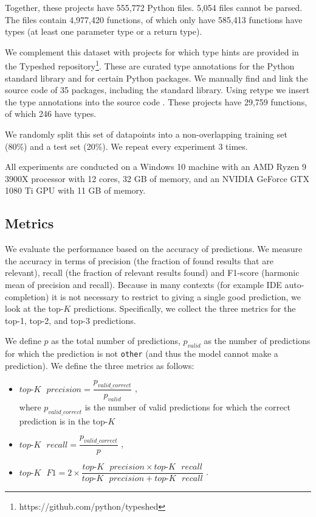 Together, these projects have 555,772 Python files. 5,054 files cannot be parsed.
The files contain 4,977,420 functions, of which only have 585,413 functions have types (at least one parameter type or a return type).

We complement this dataset with projects for which type hints are provided in the Typeshed repository\footnote{https://github.com/python/typeshed}. These are curated type annotations for the Python standard library and for certain Python packages. We manually find and link the source code of 35 packages, including the standard library. Using retype we insert the type annotations into the source code \cite{2017Retype}. These projects have 29,759 functions, of which 246 have types.

We randomly split this set of datapoints into a non-overlapping training set (80\%) and a test set (20\%). We repeat every experiment 3 times.

All experiments are conducted on a Windows 10 machine with an AMD Ryzen 9 3900X processor with 12 cores, 32 GB of memory, and an NVIDIA GeForce GTX 1080 Ti GPU with 11 GB of memory.

\subsection{Metrics} \label{evaluation:metrics}
We evaluate the performance based on the accuracy of predictions.
We measure the accuracy in terms of precision (the fraction of found results that are relevant), recall (the fraction of relevant results found) and F1-score (harmonic mean of precision and recall).
Because in many contexts (for example IDE auto-completion) it is not necessary to restrict to giving a single good prediction, we look at the top-$K$ predictions. 
Specifically, we collect the three metrics for the top-1, top-2, and top-3 predictions.

We define $p$ as the total number of predictions, $p_{valid}$ as the number of predictions for which the prediction is not \texttt{other} (and thus the model cannot make a prediction). We define the three metrics as follows: 

\begin{itemize}
    \item $top\text{-}K\text{ }precision =     
        \dfrac{
            p_{valid\_correct}
        }{
            p_{valid}
        }
        $
        , \\ where $p_{valid\_correct}$ is the number of valid predictions for which the correct prediction is in the top-$K$
    
    \item $top\text{-}K\text{ }recall =     
        \dfrac{
            p_{valid\_correct}
        }{
            p
        }
        $
        ,
    
    \item $top\text{-}K\text{ }F1 = 
        2 \times
        \dfrac{
            top\text{-}K\text{ }precision \times top\text{-}K\text{ }recall
        }{
             top\text{-}K\text{ }precision + top\text{-}K\text{ }recall
        }
        $
        .
\end{itemize}


